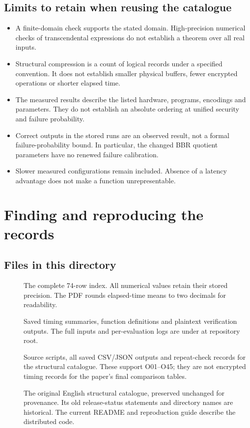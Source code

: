 \documentclass[a4paper,10pt]{article}
\begin{document}
\subsection{Limits to retain when reusing the catalogue}
\begin{itemize}
\item A finite-domain check supports the stated domain. High-precision numerical checks of transcendental expressions do not establish a theorem over all real inputs.
\item Structural compression is a count of logical records under a specified convention. It does not establish smaller physical buffers, fewer encrypted operations or shorter elapsed time.
\item The measured results describe the listed hardware, programs, encodings and parameters. They do not establish an absolute ordering at unified security and failure probability.
\item Correct outputs in the stored runs are an observed result, not a formal failure-probability bound. In particular, the changed BBR quotient parameters have no renewed failure calibration.
\item Slower measured configurations remain included. Absence of a latency advantage does not make a function unrepresentable.
\end{itemize}

\newpage
\section{Finding and reproducing the records}
\subsection{Files in this directory}
\begin{description}
\item[] The complete 74-row index. All numerical values retain their stored precision. The PDF rounds elapsed-time means to two decimals for readability.
\item[] Saved timing summaries, function definitions and plaintext verification outputs. The full inputs and per-evaluation logs are under  at repository root.
\item[] Source scripts, all saved CSV/JSON outputs and repeat-check records for the structural catalogue. These support O01--O45; they are not encrypted timing records for the paper's final comparison tables.
\item[] The original English structural catalogue, preserved unchanged for provenance. Its old release-status statements and directory names are historical. The current README and reproduction guide describe the distributed code.
\end{description}
\end{document}
